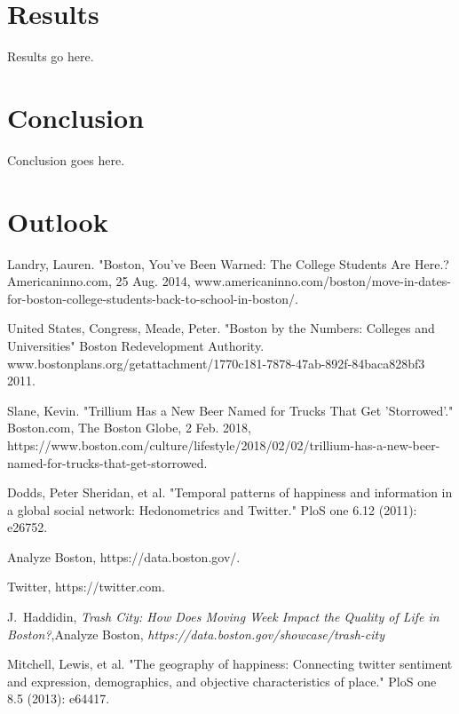 \documentclass[journal, a4paper]{IEEEtran}
\begin{document}
\section{Results}
Results go here.
\section{Conclusion}
Conclusion goes here.
\section{Outlook}

\begin{thebibliography}{5}

    Landry, Lauren. "Boston, You've Been Warned: The College Students Are Here.? Americaninno.com, 25 Aug. 2014, www.americaninno.com/boston/move-in-dates-for-boston-college-students-back-to-school-in-boston/.
    
    United States, Congress, Meade, Peter. "Boston by the Numbers: Colleges and Universities" Boston Redevelopment Authority. www.bostonplans.org/getattachment/1770c181-7878-47ab-892f-84baca828bf3 2011.
    
    Slane, Kevin. "Trillium Has a New Beer Named for Trucks That Get 'Storrowed'." Boston.com, The Boston Globe, 2 Feb. 2018, https://www.boston.com/culture/lifestyle/2018/02/02/trillium-has-a-new-beer-named-for-trucks-that-get-storrowed.
    
    Dodds, Peter Sheridan, et al. "Temporal patterns of happiness and information in a global social network: Hedonometrics and Twitter." PloS one 6.12 (2011): e26752.
    
    Analyze Boston, https://data.boston.gov/.

   Twitter, https://twitter.com.
   
   J.~Haddidin,  \emph{Trash City: How Does Moving Week Impact the Quality of Life in Boston?},\relax Analyze Boston,  \emph{https://data.boston.gov/showcase/trash-city}
   
   Mitchell, Lewis, et al. "The geography of happiness: Connecting twitter sentiment and expression, demographics, and objective characteristics of place." PloS one 8.5 (2013): e64417.
   

\end{thebibliography}
\end{document}
